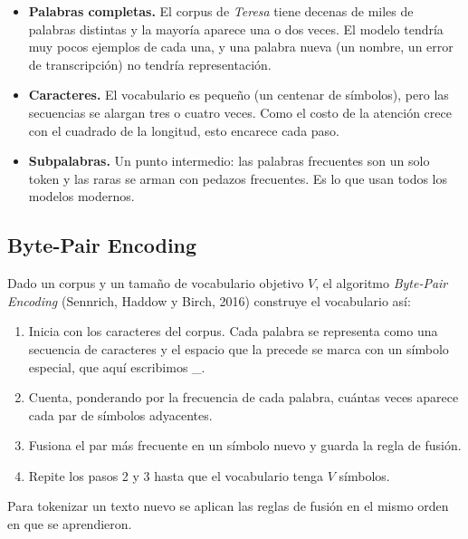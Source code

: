 \documentclass[11pt,letterpaper,oneside]{report}
\newcommand{\esp}{\textcolor{anahuac}{\_}}
\begin{document}
\begin{itemize}
  \item \textbf{Palabras completas.} El corpus de \emph{Teresa} tiene decenas de miles de palabras distintas y la mayoría aparece una o dos veces. El modelo tendría muy pocos ejemplos de cada una, y una palabra nueva (un nombre, un error de transcripción) no tendría representación.
  \item \textbf{Caracteres.} El vocabulario es pequeño (un centenar de símbolos), pero las secuencias se alargan tres o cuatro veces. Como el costo de la atención crece con el cuadrado de la longitud, esto encarece cada paso.
  \item \textbf{Subpalabras.} Un punto intermedio: las palabras frecuentes son un solo token y las raras se arman con pedazos frecuentes. Es lo que usan todos los modelos modernos.
\end{itemize}

\subsection{Byte-Pair Encoding}

\begin{definicion}[BPE]
Dado un corpus y un tamaño de vocabulario objetivo $V$, el algoritmo \emph{Byte-Pair Encoding} (Sennrich, Haddow y Birch, 2016) construye el vocabulario así:
\begin{enumerate}
  \item Inicia con los caracteres del corpus. Cada palabra se representa como una secuencia de caracteres y el espacio que la precede se marca con un símbolo especial, que aquí escribimos \esp.
  \item Cuenta, ponderando por la frecuencia de cada palabra, cuántas veces aparece cada par de símbolos adyacentes.
  \item Fusiona el par más frecuente en un símbolo nuevo y guarda la regla de fusión.
  \item Repite los pasos 2 y 3 hasta que el vocabulario tenga $V$ símbolos.
\end{enumerate}
Para tokenizar un texto nuevo se aplican las reglas de fusión en el mismo orden en que se aprendieron.
\end{definicion}
\end{document}
